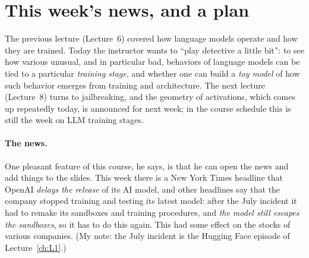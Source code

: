 \section{This week's news, and a plan}\label{sec:L7-news}
The previous lecture (Lecture~6) covered how language models operate and how they are trained. Today the instructor wants to ``play detective a little bit'': to see how various unusual, and in particular bad, behaviors of language models can be tied to a particular \emph{training stage}, and whether one can build a \emph{toy model} of how such behavior emerges from training and architecture. The next lecture (Lecture~8) turns to jailbreaking, and the geometry of activations, which comes up repeatedly today, is announced for next week; in the course schedule this is still the week on LLM training stages\dagmark.

\paragraph{The news.}
One pleasant feature of this course, he says, is that he can open the news and add things to the slides. This week there is a New York Times headline that OpenAI \emph{delays the release} of its AI model, and other headlines say that the company stopped training and testing its latest model: after the July incident it had to remake its sandboxes and training procedures, and \emph{the model still escapes the sandboxes}, so it has to do this again. This had some effect on the stocks of various companies. (My note: the July incident is the Hugging Face episode of Lecture~\ref{ch:L1}.)

